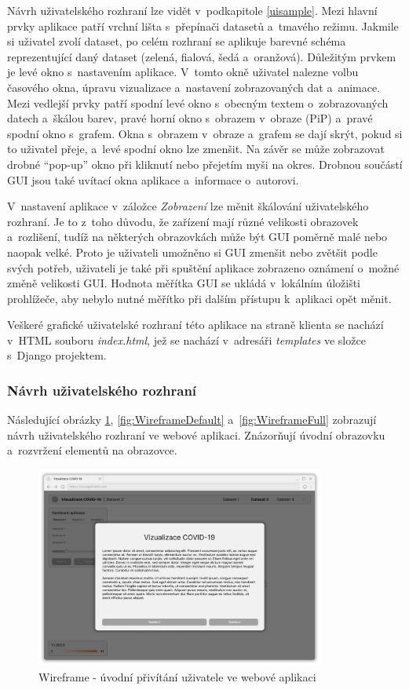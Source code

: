 Návrh uživatelského rozhraní lze vidět v~podkapitole \ref{uisample}. Mezi hlavní prvky aplikace patří vrchní lišta s~přepínači datasetů a~tmavého režimu. Jakmile si uživatel zvolí dataset, po celém rozhraní se aplikuje barevné schéma reprezentující daný dataset (zelená, fialová, šedá a~oranžová). Důležitým prvkem je levé okno s~nastavením aplikace. V~tomto okně uživatel nalezne volbu časového okna, úpravu vizualizace a~nastavení zobrazovaných dat a~animace. Mezi vedlejší prvky patří spodní levé okno s~obecným textem o~zobrazovaných datech a~škálou barev, pravé horní okno s~obrazem v~obraze (PiP) a~pravé spodní okno s~grafem. Okna s~obrazem v~obraze a~grafem se dají skrýt, pokud si to uživatel přeje, a~levé spodní okno lze zmenšit. Na závěr se může zobrazovat drobné \enquote{pop-up} okno při kliknutí nebo přejetím myši na okres. Drobnou součástí GUI jsou také uvítací okna aplikace a~informace o~autorovi.

V~nastavení aplikace v~záložce \emph{Zobrazení} lze měnit škálování uživatelského rozhraní. Je to z~toho důvodu, že zařízení mají různé velikosti obrazovek a~rozlišení, tudíž na některých obrazovkách může být GUI poměrně malé nebo naopak velké. Proto je uživateli umožněno si GUI zmenšit nebo zvětšit podle svých potřeb, uživateli je také při spuštění aplikace zobrazeno oznámení o~možné změně velikosti GUI. Hodnota měřítka GUI se ukládá v~lokálním úložišti prohlížeče, aby nebylo nutné měřítko při dalším přístupu k~aplikaci opět měnit.

Veškeré grafické uživatelské rozhraní této aplikace na straně klienta se nachází v~HTML souboru \emph{index.html}, jež se nachází v~adresáři \emph{templates} ve složce s~Django projektem.

\subsubsection*{Návrh uživatelského rozhraní}
Následující obrázky \ref{fig:WireframeWelcome}, \ref{fig:WireframeDefault} a~\ref{fig:WireframeFull} zobrazují návrh uživatelského rozhraní ve webové aplikaci. Znázorňují úvodní obrazovku a~rozvržení elementů na obrazovce.


\label{wireframes}
\begin{figure}[H]
	\centering
	\includegraphics[width=0.85\textwidth]{Pictures/wireframe_welcome.pdf} 
	\caption{Wireframe - úvodní přivítání uživatele ve webové aplikaci}
	\label{fig:WireframeWelcome}
\end{figure}

